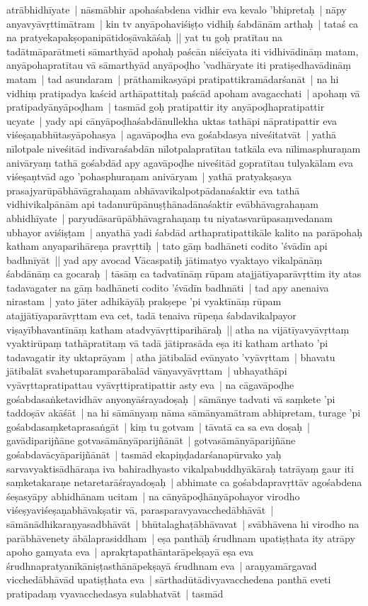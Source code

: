 \documentclass[article,12pt,a4paper]{memoir}
\begin{document}
	  \pstart atrābhidhīyate | nāsmābhir apohaśabdena vidhir eva kevalo 'bhipretaḥ | nāpy anyavyāvṛttimātram | kin tv anyāpohaviśiṣṭo vidhiḥ śabdānām arthaḥ | tataś ca na pratyekapakṣopanipātidoṣāvakāśaḥ || \label{thakur75-59.7} yat tu goḥ pratītau na tadātmāparātmeti sāmarthyād apohaḥ paścān niścīyata iti vidhivādināṃ matam, anyāpohapratītau vā sāmarthyād anyāpoḍho 'vadhāryate iti pratiṣedhavādināṃ matam | tad asundaram | prāthamikasyāpi pratipattikramādarśanāt | na hi vidhiṃ pratipadya kaścid arthāpattitaḥ paścād apoham avagacchati | apohaṃ vā pratipadyānyāpoḍham | tasmād goḥ pratipattir ity anyāpoḍhapratipattir ucyate | yady api cānyāpoḍhaśabdānullekha uktas tathāpi nāpratipattir eva viśeṣaṇabhūtasyāpohasya | agavāpoḍha eva gośabdasya niveśitatvāt | yathā nīlotpale niveśitād indīvaraśabdān nīlotpalapratītau tatkāla eva nīlimasphuraṇam anivāryaṃ tathā gośabdād apy agavāpoḍhe niveśitād gopratītau tulyakālam eva viśeṣaṇtvād ago 'pohasphuraṇam anivāryam | yathā pratyakṣasya prasajyarūpābhāvāgrahaṇam abhāvavikalpotpādanaśaktir eva tathā vidhivikalpānām api tadanurūpānuṣṭhānadānaśaktir evābhāvagrahaṇam abhidhīyate | paryudāsarūpābhāvagrahaṇaṃ tu niyatasvarūpasaṃvedanam ubhayor aviśiṣṭam | anyathā yadi śabdād arthapratipattikāle kalito na parāpohaḥ katham anyaparihāreṇa pravṛttiḥ | tato gāṃ badhāneti codito 'śvādīn api badhnīyāt || \label{thakur75-59.21} yad apy avocad Vācaspatiḥ jātimatyo vyaktayo vikalpānāṃ śabdānāṃ ca gocaraḥ | tāsāṃ ca tadvatīnāṃ rūpam atajjātīyaparāvṛttim ity atas tadavagater na gāṃ badhāneti codito 'śvādīn badhnāti | tad apy anenaiva nirastam | yato jāter adhikāyāḥ prakṣepe 'pi vyaktīnāṃ rūpam atajjātīyaparāvṛttam eva cet, tadā tenaiva rūpeṇa śabdavikalpayor viṣayībhavantīnāṃ katham atadvyāvṛttiparihāraḥ || \label{thakur75-59.26} atha na vijātīyavyāvṛttaṃ vyaktirūpaṃ tathāpratītaṃ vā tadā jātiprasāda eṣa iti katham arthato 'pi tadavagatir ity uktaprāyam | \label{thakur75-59.28} atha jātibalād evānyato 'vyāvṛttam | bhavatu jātibalāt svahetuparamparābalād vānyavyāvṛttam | ubhayathāpi vyāvṛttapratipattau vyāvṛttipratipattir asty eva | \label{thakur75-60.1} na cāgavāpoḍhe gośabdasaṅketavidhāv anyonyāśrayadoṣaḥ | sāmānye tadvati vā saṃkete 'pi taddoṣāv akāśāt | na hi sāmānyaṃ nāma sāmānyamātram abhipretam, turage 'pi gośabdasaṃketaprasaṅgāt | kiṃ tu gotvam | tāvatā ca sa eva doṣaḥ | gavādiparijñāne gotvasāmānyāparijñānāt | gotvasāmānyāparijñāne gośabdavācyāparijñānāt | \label{thakur75-60.6} tasmād ekapiṇḍadarśanapūrvako yaḥ sarvavyaktisādhāraṇa iva bahiradhyasto vikalpabuddhyākāraḥ tatrāyaṃ gaur iti saṃketakaraṇe netaretarāśrayadoṣaḥ | \label{thakur75-60.8} abhimate ca gośabdapravṛttāv agośabdena śeṣasyāpy abhidhānam ucitam | na cānyāpoḍhānyāpohayor virodho viśeṣyaviśeṣaṇabhāvakṣatir vā, parasparavyavacchedābhāvāt | sāmānādhikaraṇyasadbhāvāt | bhūtalaghaṭābhāvavat | svābhāvena hi virodho na parābhāvenety ābālaprasiddham | eṣa panthāḥ śrudhnam upatiṣṭhata ity atrāpy apoho gamyata eva | aprakṛtapathāntarāpekṣayā eṣa eva śrudhnapratyanīkāniṣṭasthānāpekṣayā śrudhnam eva | araṇyamārgavad vicchedābhāvād upatiṣṭhata eva | sārthadūtādivyavacchedena panthā eveti pratipadaṃ vyavacchedasya sulabhatvāt | tasmād 
\end{document}
